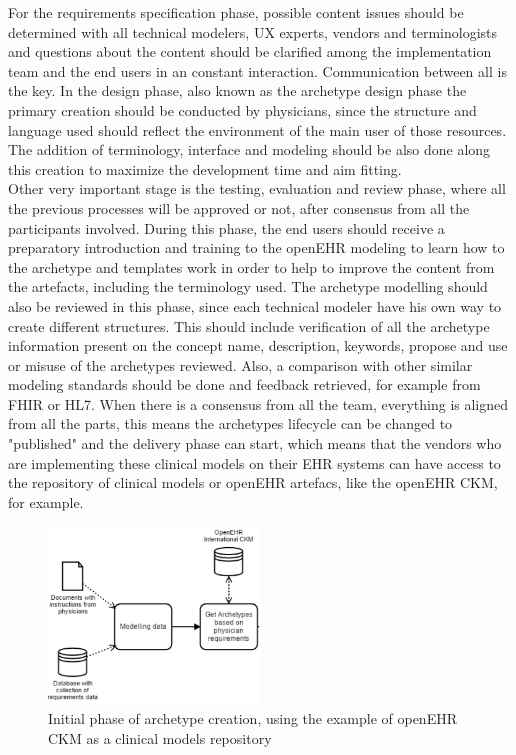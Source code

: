 \documentclass[mim_thesis.tex]{subfiles}
\begin{document}
For the requirements specification phase, possible content issues should be determined with all technical modelers, \ac{UX} experts, vendors and terminologists and questions about the content should be clarified among the implementation team and the end users in an constant interaction. Communication between all is the key. In the design phase, also known as the archetype design phase \citep{Madsen2010} the primary creation should be conducted by physicians, since the structure and language used should reflect the environment of the main user of those resources. The addition of terminology, interface and modeling should be also done along this creation to maximize the development time and aim fitting. \\

Other very important stage is the testing, evaluation and review phase, where all the previous processes will be approved or not, after consensus from all the participants involved. During this phase, the end users should receive a preparatory introduction and training to the openEHR modeling to learn how to the archetype and templates work in order to help to improve the content from the artefacts, including the terminology used. The archetype modelling should also be reviewed in this phase, since each technical modeler have his own way to create different structures. This should include verification of all the archetype information present on the concept name, description, keywords, propose and use or misuse of the archetypes reviewed. Also, a comparison with other similar modeling standards should be done and feedback retrieved, for example from FHIR or HL7. When there is a consensus from all the team, everything is aligned from all the parts, this means the archetypes lifecycle can be changed to "published" and the delivery phase can start, which means that the vendors who are implementing these clinical models on their EHR systems can have access to the repository of clinical models or openEHR artefacs, like the openEHR CKM, for example. \\


\begin{figure}[H]
	\centering
    \includegraphics[width=0.5\textwidth]{img/LC_ARCH.PNG}
	\caption{Initial phase of archetype creation, using the example of openEHR CKM as a clinical models repository}
	\label{fig:LC_ARCH}
\end{figure}
\end{document}
